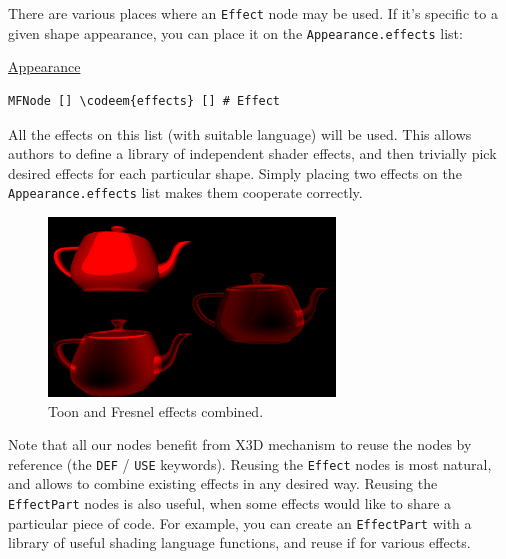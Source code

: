 \documentclass{egpubl}
\newenvironment{mycode}
{\begin{mycodecore}}
{\end{mycodecore}
\vspace{-0.1in}}
\newcommand*{\codeem}[1]{\textbf{#1}}
\begin{document}
There are various places where an \texttt{Effect} node may be used.
If it's specific to a given shape appearance, you can place it
on the \texttt{Appearance.effects} list:

\begin{mycode}
\underline{Appearance}
\begin{Verbatim}[commandchars=\\\{\},fontsize=\small]
MFNode [] \codeem{effects} [] # Effect
\end{Verbatim}
\end{mycode}

All the effects on this list (with suitable language) will be used.
This allows authors to define a library of independent shader effects,
and then trivially pick desired effects for each particular shape.
Simply placing two effects on the \texttt{Appearance.effects} list
makes them cooperate correctly.

\begin{figure}[H]
  \centering
  \includegraphics[width=3in]{fresnel_and_toon}
  \caption{Toon and Fresnel effects combined.}
\end{figure}

Note that all our nodes benefit from X3D mechanism to reuse the nodes
by reference (the \texttt{DEF} / \texttt{USE} keywords). Reusing the
\texttt{Effect} nodes
is most natural, and allows to combine existing effects in any desired way.
Reusing the \texttt{EffectPart} nodes is also useful, when some effects
would like to share a particular piece of code. For example,
you can create an \texttt{EffectPart} with a library of useful
shading language functions, and reuse if for various effects.
\end{document}
